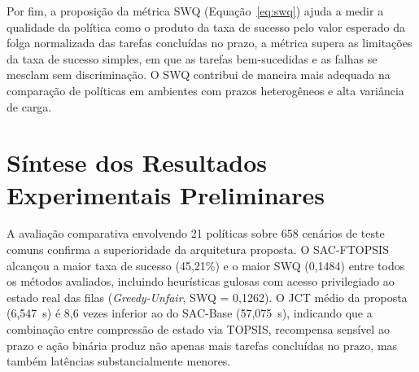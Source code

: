 
Por fim, a proposição da métrica \gls{SWQ} (Equação~\ref{eq:swq}) ajuda a medir a qualidade da política como o produto da taxa de sucesso pelo valor esperado da folga normalizada das tarefas concluídas no prazo, a métrica supera as limitações da taxa de sucesso simples, em que as tarefas bem-sucedidas e as falhas se mesclam sem discriminação. O \gls{SWQ} contribui de maneira mais adequada na comparação de políticas em ambientes com prazos heterogêneos e alta variância de carga.

\section{Síntese dos Resultados Experimentais Preliminares}
\label{sec:sintese-resultados}

A avaliação comparativa envolvendo 21 políticas sobre 658 cenários de teste comuns confirma a superioridade da arquitetura proposta. O \gls{SAC}-FTOPSIS alcançou a maior taxa de sucesso (45,21\%) e o maior \gls{SWQ} (0,1484) entre todos os métodos avaliados, incluindo heurísticas gulosas com acesso privilegiado ao estado real das filas (\textit{Greedy-Unfair}, \gls{SWQ} = 0,1262). O \gls{JCT} médio da proposta (6,547~s) é 8,6 vezes inferior ao do \gls{SAC}-Base (57,075~s), indicando que a combinação entre compressão de estado via \gls{TOPSIS}, recompensa sensível ao prazo e ação binária produz não apenas mais tarefas concluídas no prazo, mas também latências substancialmente menores.

